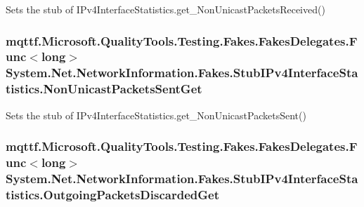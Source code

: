 Sets the stub of I\-Pv4\-Interface\-Statistics.\-get\-\_\-\-Non\-Unicast\-Packets\-Received()

\hypertarget{class_system_1_1_net_1_1_network_information_1_1_fakes_1_1_stub_i_pv4_interface_statistics_a8faabf45c61a8c042e75a6d63f782978}{
\subsubsection[{Non\-Unicast\-Packets\-Sent\-Get}]{\setlength{\rightskip}{0pt plus 5cm}mqttf.\-Microsoft.\-Quality\-Tools.\-Testing.\-Fakes.\-Fakes\-Delegates.\-Func$<$long$>$ System.\-Net.\-Network\-Information.\-Fakes.\-Stub\-I\-Pv4\-Interface\-Statistics.\-Non\-Unicast\-Packets\-Sent\-Get}}\label{class_system_1_1_net_1_1_network_information_1_1_fakes_1_1_stub_i_pv4_interface_statistics_a8faabf45c61a8c042e75a6d63f782978}


Sets the stub of I\-Pv4\-Interface\-Statistics.\-get\-\_\-\-Non\-Unicast\-Packets\-Sent()

\hypertarget{class_system_1_1_net_1_1_network_information_1_1_fakes_1_1_stub_i_pv4_interface_statistics_a563acb8769d636b6751fb11d1f65734f}{
\subsubsection[{Outgoing\-Packets\-Discarded\-Get}]{\setlength{\rightskip}{0pt plus 5cm}mqttf.\-Microsoft.\-Quality\-Tools.\-Testing.\-Fakes.\-Fakes\-Delegates.\-Func$<$long$>$ System.\-Net.\-Network\-Information.\-Fakes.\-Stub\-I\-Pv4\-Interface\-Statistics.\-Outgoing\-Packets\-Discarded\-Get}}\label{class_system_1_1_net_1_1_network_information_1_1_fakes_1_1_stub_i_pv4_interface_statistics_a563acb8769d636b6751fb11d1f65734f}


